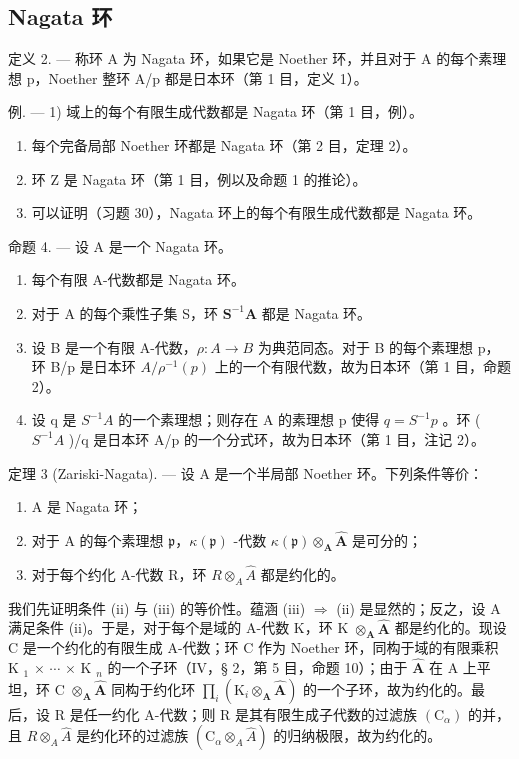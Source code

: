 \subsection{Nagata 环}

定义 2. --- 称环 A 为 Nagata 环，如果它是 Noether 环，并且对于 A 的每个素理想 p，Noether 整环 A/p 都是日本环（第 1 目，定义 1）。

例. --- 1) 域上的每个有限生成代数都是 Nagata 环（第 1 目，例）。

\begin{enumerate}
\def\labelenumi{\arabic{enumi})}
\setcounter{enumi}{1}
\item
  每个完备局部 Noether 环都是 Nagata 环（第 2 目，定理 2）。
\item
  环 Z 是 Nagata 环（第 1 目，例以及命题 1 的推论）。
\item
  可以证明（习题 30），Nagata 环上的每个有限生成代数都是 Nagata 环。
\end{enumerate}

命题 4. --- 设 A 是一个 Nagata 环。

\begin{enumerate}
\def\labelenumi{\alph{enumi})}
\item
  每个有限 A-代数都是 Nagata 环。
\item
  对于 A 的每个乘性子集 S，环 \(\mathbf{S}^{-1}\mathbf{A}\) 都是 Nagata 环。
\item
  设 B 是一个有限 A-代数，\(\rho: A \to B\) 为典范同态。对于 B 的每个素理想 p，环 B/p 是日本环 \(A/\rho^{-1}(p)\) 上的一个有限代数，故为日本环（第 1 目，命题 2）。
\item
  设 q 是 \(S^{-1}A\) 的一个素理想；则存在 A 的素理想 p 使得 \(q = S^{-1}p\) 。环 ( \(S^{-1}A\) )/q 是日本环 A/p 的一个分式环，故为日本环（第 1 目，注记 2）。
\end{enumerate}

定理 3 (Zariski-Nagata). --- 设 A 是一个半局部 Noether 环。下列条件等价：

\begin{enumerate}
\def\labelenumi{(\roman{enumi})}
\item
  A 是 Nagata 环；
\item
  对于 A 的每个素理想 \(\mathfrak{p}\)，\(\kappa(\mathfrak{p})\) -代数 \(\kappa(\mathfrak{p}) \otimes_{\mathbf{A}} \hat{\mathbf{A}}\) 是可分的；
\item
  对于每个约化 A-代数 R，环 \(R \otimes_{A} \hat{A}\) 都是约化的。
\end{enumerate}

我们先证明条件 (ii) 与 (iii) 的等价性。蕴涵 (iii) \(\Rightarrow\) (ii) 是显然的；反之，设 A 满足条件 (ii)。于是，对于每个是域的 A-代数 K，环 K \(\otimes_{\mathbf{A}}\hat{\mathbf{A}}\) 都是约化的。现设 C 是一个约化的有限生成 A-代数；环 C 作为 Noether 环，同构于域的有限乘积 K \(_1\) \(\times\) \(\cdots\) \(\times\) K \(_n\) 的一个子环（IV，§ 2，第 5 目，命题 10）；由于 \(\hat{\mathbf{A}}\) 在 A 上平坦，环 C \(\otimes_{\mathbf{A}}\hat{\mathbf{A}}\) 同构于约化环 \(\prod_{i}(\mathrm{K}_{i}\otimes_{\mathbf{A}}\hat{\mathbf{A}})\) 的一个子环，故为约化的。最后，设 R 是任一约化 A-代数；则 R 是其有限生成子代数的过滤族 \((\mathrm{C}_{\alpha})\) 的并，且 \(R \otimes_{A} \hat{A}\) 是约化环的过滤族 \((\mathrm{C}_{\alpha} \otimes_{A} \hat{A})\) 的归纳极限，故为约化的。

